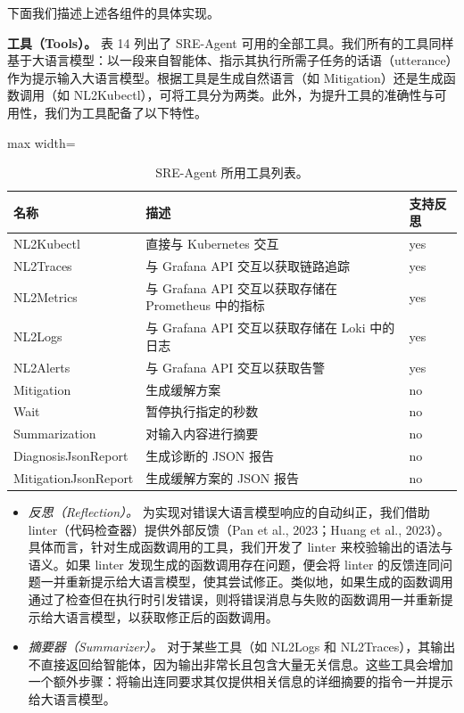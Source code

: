 下面我们描述上述各组件的具体实现。

\textbf{工具（Tools）。} 表 14 列出了 SRE-Agent 可用的全部工具。我们所有的工具同样基于大语言模型：以一段来自智能体、指示其执行所需子任务的话语（utterance）作为提示输入大语言模型。根据工具是生成自然语言（如 Mitigation）还是生成函数调用（如 NL2Kubectl），可将工具分为两类。此外，为提升工具的准确性与可用性，我们为工具配备了以下特性。

\begin{table}[H]
\centering
\caption{SRE-Agent 所用工具列表。}
\label{tab:itb-tab14}
\begin{adjustbox}{max width=\linewidth}
\begin{tabular}{lll}
\toprule
\textbf{名称} & \textbf{描述} & \textbf{支持反思} \\
\midrule
NL2Kubectl & 直接与 Kubernetes 交互 & yes \\
NL2Traces & 与 Grafana API 交互以获取链路追踪 & yes \\
NL2Metrics & 与 Grafana API 交互以获取存储在 Prometheus 中的指标 & yes \\
NL2Logs & 与 Grafana API 交互以获取存储在 Loki 中的日志 & yes \\
NL2Alerts & 与 Grafana API 交互以获取告警 & yes \\
Mitigation & 生成缓解方案 & no \\
Wait & 暂停执行指定的秒数 & no \\
Summarization & 对输入内容进行摘要 & no \\
DiagnosisJsonReport & 生成诊断的 JSON 报告 & no \\
MitigationJsonReport & 生成缓解方案的 JSON 报告 & no \\
\bottomrule
\end{tabular}
\end{adjustbox}
\end{table}

\begin{itemize}
\item \emph{反思（Reflection）。} 为实现对错误大语言模型响应的自动纠正，我们借助 linter（代码检查器）提供外部反馈（Pan et al., 2023；Huang et al., 2023）。具体而言，针对生成函数调用的工具，我们开发了 linter 来校验输出的语法与语义。如果 linter 发现生成的函数调用存在问题，便会将 linter 的反馈连同问题一并重新提示给大语言模型，使其尝试修正。类似地，如果生成的函数调用通过了检查但在执行时引发错误，则将错误消息与失败的函数调用一并重新提示给大语言模型，以获取修正后的函数调用。
\item \emph{摘要器（Summarizer）。} 对于某些工具（如 NL2Logs 和 NL2Traces），其输出不直接返回给智能体，因为输出非常长且包含大量无关信息。这些工具会增加一个额外步骤：将输出连同要求其仅提供相关信息的详细摘要的指令一并提示给大语言模型。
\end{itemize}

